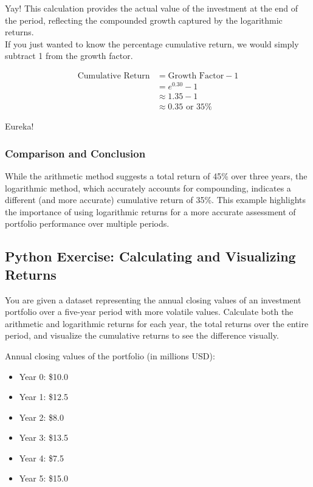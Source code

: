 \documentclass{article}
\begin{document}
Yay! This calculation provides the actual value of the investment at the end of the period, reflecting the compounded growth captured by the logarithmic returns. \\

If you just wanted to know the percentage cumulative return, we would simply subtract 1 from the growth factor.

\begin{align*}
    \text{Cumulative Return} &= \text{Growth Factor} - 1 \\
                             &= e^{0.30} - 1 \\
                             &\approx 1.35 - 1 \\
                             &\approx 0.35 \text{ or } 35\%
\end{align*}

Eureka!

\subsubsection{Comparison and Conclusion}

While the arithmetic method suggests a total return of 45\% over three years, the logarithmic method, which accurately accounts for compounding, indicates a different (and more accurate) cumulative return of 35\%. This example highlights the importance of using logarithmic returns for a more accurate assessment of portfolio performance over multiple periods.

\subsection{Python Exercise: Calculating and Visualizing Returns}

You are given a dataset representing the annual closing values of an investment portfolio over a five-year period with more volatile values. Calculate both the arithmetic and logarithmic returns for each year, the total returns over the entire period, and visualize the cumulative returns to see the difference visually. 

Annual closing values of the portfolio (in millions USD):

\begin{itemize}
    \item Year 0: \$10.0
    \item Year 1: \$12.5
    \item Year 2: \$8.0
    \item Year 3: \$13.5
    \item Year 4: \$7.5
    \item Year 5: \$15.0
\end{itemize}
\end{document}
